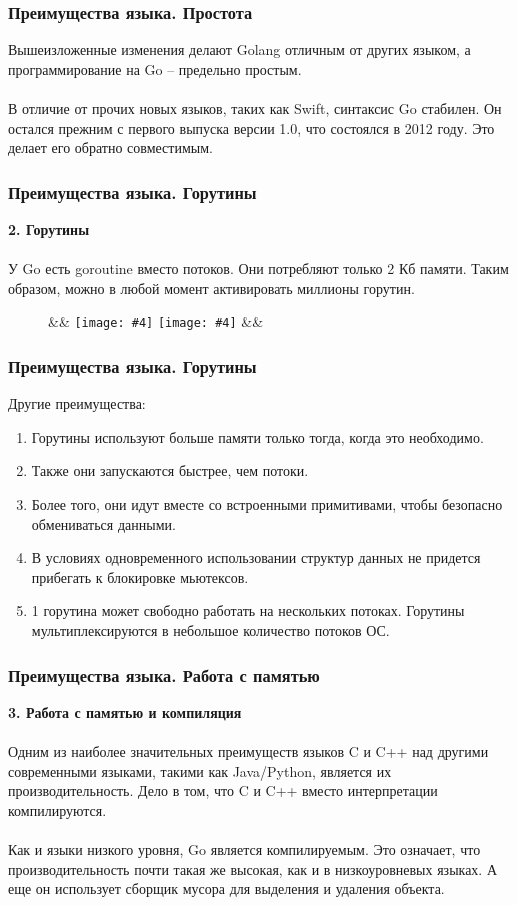 \documentclass{beamer}
\newcommand{\imagebox}[6]{
      #1
      \begin{figure}[!ht]
          #2
          \ifx&#3&%
          \texttt{[image: \#4]}
          \else
          \texttt{[image: \#4]}
          \fi
          \ifx&#5&%
          \label{fig:#6}
          \else
          \caption{#5}\label{fig:#6}
          \fi
      \end{figure}
      #1 
      \phantom{imageboxfix}
  }
\begin{document}
\begin{frame}[fragile] \frametitle{Преимущества языка. Простота}
  Вышеизложенные изменения делают Golang отличным от других языком, а
  программирование на Go – предельно простым. 
  \\\\
  В отличие от прочих новых языков, таких как Swift, синтаксис Go стабилен. Он
  остался прежним с первого выпуска версии 1.0, что состоялся в 2012 году. Это
  делает его обратно совместимым.
  
\end{frame}
\begin{frame}[fragile] \frametitle{Преимущества языка. Горутины}
  \textbf{2. Горутины}
  \\\\
  У Go есть goroutine вместо потоков. Они потребляют только 2 Кб памяти. Таким
  образом, можно в любой момент активировать миллионы горутин.
  \imagebox{}{\centering}{}{resources/01-goroutines.jpg}{}{pic01}
\end{frame}
\begin{frame}[fragile] \frametitle{Преимущества языка. Горутины}
  Другие преимущества:
  \begin{enumerate}
    \item Горутины используют больше памяти только тогда, когда это необходимо.
    \item Также они запускаются быстрее, чем потоки.
    \item Более того, они идут вместе со встроенными примитивами, чтобы
    безопасно обмениваться данными.
    \item В условиях одновременного использовании структур данных не придется
    прибегать к блокировке мьютексов.
    \item 1 горутина может свободно работать на нескольких потоках. Горутины
    мультиплексируются в небольшое количество потоков ОС.
  \end{enumerate}
\end{frame}
\begin{frame}[fragile] \frametitle{Преимущества языка. Работа с памятью}
  \textbf{3. Работа с памятью и компиляция}
  \\\\
  Одним из наиболее значительных преимуществ языков C и C++ над другими
  современными языками, такими как Java/Python, является их производительность.
  Дело в том, что C и C++ вместо интерпретации компилируются.
  \\\\
  Как и языки низкого уровня, Go является компилируемым. Это означает, что
  производительность почти такая же высокая, как и в низкоуровневых языках. А
  еще он использует сборщик мусора для выделения и удаления объекта.
  
\end{frame}
\end{document}

